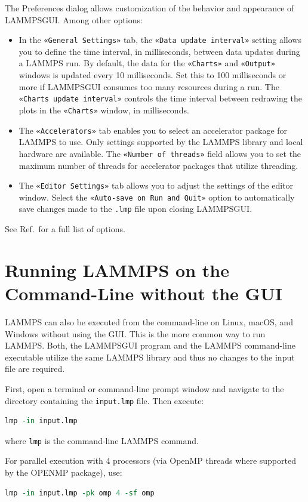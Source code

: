 \documentclass[9pt,tutorial]{livecoms}
\newcommand{\flecmd}[1]{\textcolor{command}{\texttt{#1}}} %
\newcommand{\guicmd}[1]{\textcolor{command}{\texttt{«#1»}}} %
\newcommand{\lammpsgui}{\textsf{LAMMPS\textendash GUI}}
\begin{document}
\begin{appendices}
The Preferences dialog allows customization of the behavior and appearance of
\lammpsgui{}.  Among other options:
\begin{itemize}
\item In the \guicmd{General Settings} tab, the \guicmd{Data update interval} setting
allows you to define the time interval, in milliseconds, between data updates during
a LAMMPS run.  By default, the data for the \guicmd{Charts} and \guicmd{Output}
windows is updated every 10 milliseconds.  Set this to 100 milliseconds or more
if \lammpsgui{} consumes too many resources during a run.  The \guicmd{Charts update interval}
controls the time interval between redrawing the plots in the \guicmd{Charts} window, in milliseconds.
\item The \guicmd{Accelerators} tab enables you to select an accelerator package
for LAMMPS to use.  Only settings supported by the LAMMPS library and local hardware
are available.  The \guicmd{Number of threads} field allows you to set the maximum
number of threads for accelerator packages that utilize threading.
\item The \guicmd{Editor Settings} tab allows you to adjust the settings of the editor
window.  Select the \guicmd{Auto-save on Run and Quit} option to automatically save changes
made to the \flecmd{.lmp} file upon closing \lammpsgui{}.
\end{itemize}
See Ref.\, for a full list of options.

\section{Running LAMMPS on the Command-Line without the GUI}
\label{command-line-label}

LAMMPS can also be executed from the command-line on Linux, macOS, and
Windows without using the GUI.  This is the more common way to run LAMMPS.
Both, the \lammpsgui{} program and the LAMMPS command-line executable
utilize the same LAMMPS library and thus no changes to the input file are required.

First, open a terminal or command-line prompt window and navigate to the
directory containing the \flecmd{input.lmp} file.  Then execute:
\begin{lstlisting}[language=tcl]
lmp -in input.lmp
\end{lstlisting}
where \flecmd{lmp} is the command-line LAMMPS command.

For parallel execution with 4 processors (via OpenMP threads where supported
by the OPENMP package), use:
\begin{lstlisting}[language=tcl]
lmp -in input.lmp -pk omp 4 -sf omp
\end{lstlisting}


\end{appendices}
\end{document}
